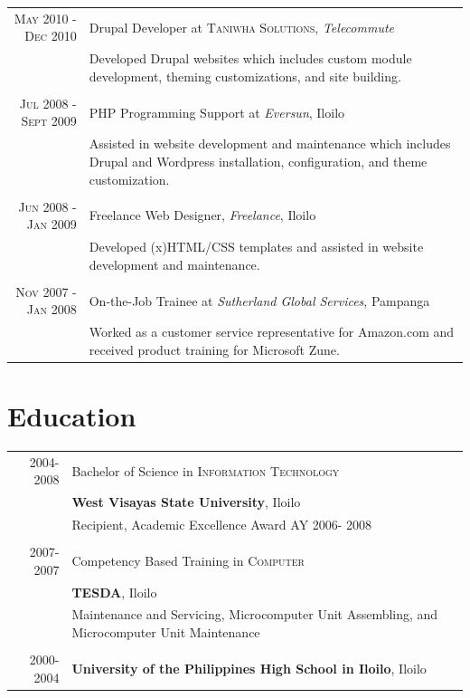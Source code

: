 \documentclass[a4paper,10pt]{article}
\begin{document}
\begin{tabular}{r|p{11cm}}
  \textsc{May 2010 - Dec 2010} & Drupal Developer at \textsc{Taniwha Solutions}, \emph{Telecommute}\\
                             &\footnotesize{Developed Drupal websites which includes custom module development, theming customizations, and site building.}\\
  \multicolumn{2}{c}{}\\

  \textsc{Jul 2008 - Sept 2009} & PHP Programming Support at \emph{Eversun}, Iloilo\\
                              &\footnotesize{Assisted in website development and maintenance which includes Drupal and Wordpress installation, configuration, and theme customization.}\\
  \multicolumn{2}{c}{}\\

  \textsc{Jun 2008 - Jan 2009} & Freelance Web Designer, \emph{Freelance}, Iloilo\\
                             &\footnotesize{Developed (x)HTML/CSS templates and assisted in website development and maintenance.}\\
  \multicolumn{2}{c}{}\\

  \textsc{Nov 2007 - Jan 2008} & On-the-Job Trainee at \emph{Sutherland Global Services}, Pampanga\\
                             &\footnotesize{Worked as a customer service representative for Amazon.com and received product training for Microsoft Zune.}\\
\end{tabular}

\section{Education}

\begin{tabular}{rp{12cm}}
  \textsc{2004-2008} & Bachelor of Science in \textsc{Information Technology}\\&\textbf{West Visayas State University}, Iloilo\\&\small{Recipient, Academic Excellence Award AY 2006- 2008}\\&\\
  \textsc{2007-2007} & Competency Based Training in \textsc{Computer}\\&\textbf{TESDA}, Iloilo\\&\small{Maintenance and Servicing, Microcomputer Unit  Assembling, and Microcomputer Unit Maintenance}\\&\\
  \textsc{2000-2004} & \textbf{University of the Philippines High School in Iloilo}, Iloilo\\
\end{tabular}
\end{document}
